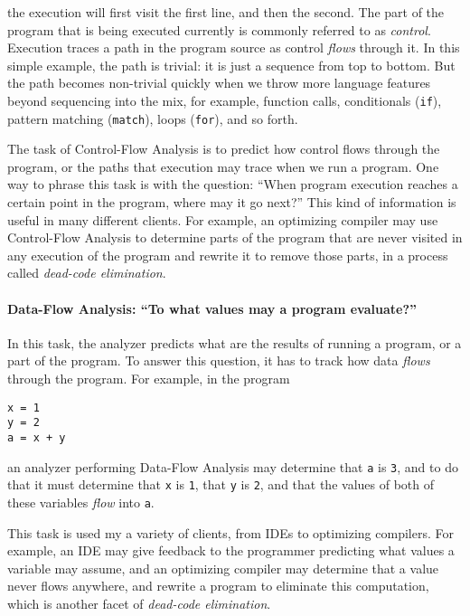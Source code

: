 \documentclass[12pt, oneside]{book}
\begin{document}
\noindent the execution will first visit the first line, and then the second. The part of the program that is being executed currently is commonly referred to as \emph{control}. Execution traces a path in the program source as control \emph{flows} through it. In this simple example, the path is trivial: it is just a sequence from top to bottom. But the path becomes non-trivial quickly when we throw more language features beyond sequencing into the mix, for example, function calls, conditionals (\texttt{if}), pattern matching (\texttt{match}), loops (\texttt{for}), and so forth.

The task of Control-Flow Analysis is to predict how control flows through the program, or the paths that execution may trace when we run a program. One way to phrase this task is with the question: “When program execution reaches a certain point in the program, where may it go next?” This kind of information is useful in many different clients. For example, an optimizing compiler may use Control-Flow Analysis to determine parts of the program that are never visited in any execution of the program and rewrite it to remove those parts, in a process called \emph{dead-code elimination}.

\paragraph{Data-Flow Analysis: “To what values may a program evaluate?”}

In this task, the analyzer predicts what are the results of running a program, or a part of the program. To answer this question, it has to track how data \emph{flows} through the program. For example, in the program

\begin{Verbatim}
x = 1
y = 2
a = x + y
\end{Verbatim}

\noindent an analyzer performing Data-Flow Analysis may determine that \texttt{a} is \texttt{3}, and to do that it must determine that \texttt{x} is \texttt{1}, that \texttt{y} is \texttt{2}, and that the values of both of these variables \emph{flow} into \texttt{a}.

This task is used my a variety of clients, from IDEs to optimizing compilers. For example, an IDE may give feedback to the programmer predicting what values a variable may assume, and an optimizing compiler may determine that a value never flows anywhere, and rewrite a program to eliminate this computation, which is another facet of \emph{dead-code elimination}.
\end{document}
